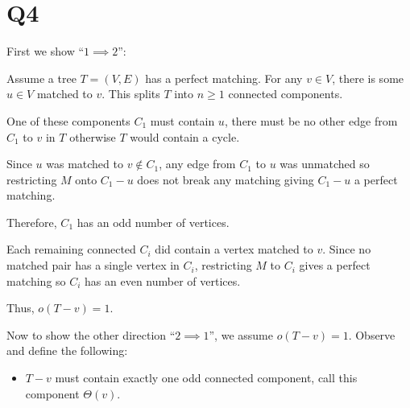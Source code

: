 \documentclass[a4paper, 11pt]{article}
\newcommand{\RR}{\mathbb{R}}
\begin{document}
\begin{multicols*}{2}
\begin{enumerate}[label=(\alph*)]

















	\end{enumerate}

	\section*{Q4}
	First we show ``$1\implies 2$'':
	\begin{mdframed}
		Assume a tree $T=(V,E)$ has a perfect matching. For any $v\in V$, there is some $u\in V$ matched to $v$. This splits $T$ into $n\geq 1$ connected components.

		One of these components $C_1$ must contain $u$, there must be no other edge from $C_1$ to $v$ in $T$ otherwise $T$ would contain a cycle.

		Since $u$ was matched to $v\notin C_1$, any edge from $C_1$ to $u$ was unmatched so restricting $M$ onto $C_1-u$ does not break any matching giving $C_1-u$ a perfect matching.

		Therefore, $C_1$ has an odd number of vertices.

		Each remaining connected $C_i$ did contain a vertex matched to $v$. Since no matched pair has a single vertex in $C_i$, restricting $M$ to $C_i$ gives a perfect matching so $C_i$ has an even number of vertices.

		Thus, $o(T-v)=1$.
	\end{mdframed}

	Now to show the other direction ``$2\implies 1$'', we assume $o(T-v)=1$.  Observe and define the following:
	\begin{itemize}
		\item
		      $T-v$ must contain exactly one odd connected component, call this component $\Theta(v)$.


\end{itemize}
\end{multicols*}
\end{document}
